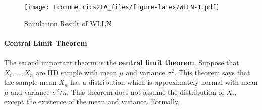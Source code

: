 \documentclass[
  12pt,
]{article}
\newenvironment{Shaded}{\begin{snugshade}}{\end{snugshade}}
\newcommand{\DataTypeTok}[1]{\textcolor[rgb]{0.13,0.29,0.53}{#1}}
\newcommand{\DecValTok}[1]{\textcolor[rgb]{0.00,0.00,0.81}{#1}}
\newcommand{\FloatTok}[1]{\textcolor[rgb]{0.00,0.00,0.81}{#1}}
\newcommand{\KeywordTok}[1]{\textcolor[rgb]{0.13,0.29,0.53}{\textbf{#1}}}
\newcommand{\NormalTok}[1]{#1}
\newcommand{\OperatorTok}[1]{\textcolor[rgb]{0.81,0.36,0.00}{\textbf{#1}}}
\newcommand{\StringTok}[1]{\textcolor[rgb]{0.31,0.60,0.02}{#1}}
\begin{document}
\begin{Shaded}
\end{Shaded}

\begin{figure}
\centering
\texttt{[image: Econometrics2TA\_files/figure-latex/WLLN-1.pdf]}
\caption{\label{fig:WLLN}Simulation Result of WLLN}
\end{figure}

\hypertarget{central-limit-theorem}{%
\paragraph{Central Limit Theorem}\label{central-limit-theorem}}

The second important theorm is the \textbf{central limit theorem}.
Suppose that \(X_i, \ldots, X_n\) are IID sample with mean \(\mu\) and variance \(\sigma^2\).
This theorem says that the sample mean \(\bar{X}_n\) has a distribution
which is approximately normal with mean \(\mu\) and variance \(\sigma^2/n\).
This theorem does not assume the distribution of \(X_i\), except the existence of the mean and variance.
Formally,
\end{document}
